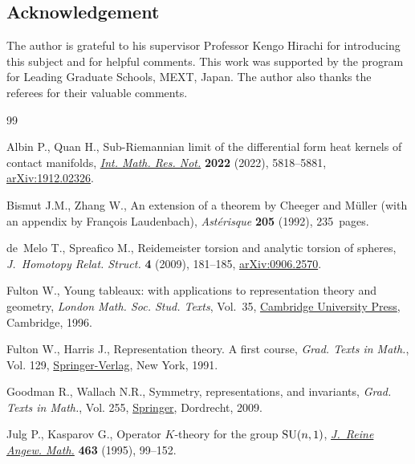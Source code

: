 \documentclass[pdftex]{sigma}
\numberwithin{equation}{section}
\begin{document}
\subsection*{Acknowledgement}
The author is grateful to his supervisor Professor Kengo Hirachi for introducing this subject and for helpful comments.
This work was supported by the program for Leading Graduate Schools, MEXT, Japan.
The author also thanks the referees for their valuable comments.


%
%

\begin{thebibliography}{99}
\footnotesize\itemsep=0pt

Albin P., Quan H., Sub-{R}iemannian limit of the differential form heat kernels
 of contact manifolds, \href{https://doi.org/10.1093/imrn/rnaa270}{\textit{Int. Math. Res. Not.}} \textbf{2022} (2022),
 5818--5881, \href{http://arxiv.org/abs/1912.02326}{arXiv:1912.02326}.

Bismut J.M., Zhang W., An extension of a theorem by {C}heeger and {M}\"{u}ller
 (with an appendix by Fran\c{c}ois Laudenbach), \textit{Ast\'{e}risque}
 \textbf{205} (1992), 235~pages.

de~Melo T., Spreafico M., Reidemeister torsion and analytic torsion of spheres,
 \textit{J.~Homotopy Relat. Struct.} \textbf{4} (2009), 181--185,
 \href{http://arxiv.org/abs/0906.2570}{arXiv:0906.2570}.

Fulton W., Young tableaux: with applications to representation theory and
 geometry, \textit{London Math. Soc. Stud. Texts}, Vol.~35, \href{https://doi.org/10.1017/CBO9780511626241}{Cambridge
 University Press}, Cambridge, 1996.

Fulton W., Harris J., Representation theory. A first course, \textit{Grad.
 Texts in Math.}, Vol. 129, \href{https://doi.org/10.1007/978-1-4612-0979-9}{Springer-Verlag}, New York, 1991.

Goodman R., Wallach N.R., Symmetry, representations, and invariants,
 \textit{Grad. Texts in Math.}, Vol. 255, \href{https://doi.org/10.1007/978-0-387-79852-3}{Springer}, Dordrecht, 2009.

Julg P., Kasparov G., Operator {$K$}-theory for the group {${\rm SU}(n,1)$},
 \href{https://doi.org/10.1515/crll.1995.463.99}{\textit{J.~Reine Angew. Math.}} \textbf{463} (1995), 99--152.


\end{thebibliography}
\end{document}
